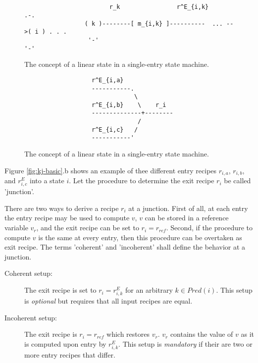 \documentclass[12pt,a4paper]{scrartcl}
\begin{document}
\begin{figure}[htbp] \leavevmode \label{fig:composition}
\begin{verbatim}
                                                     
                                                    
                        r_k                r^E_{i,k}      .-.
                 ( k )--------[ m_{i,k} ]----------  ... -->( i ) . . .
                  '-'                                     '-'

\end{verbatim}
\caption{The concept of a linear state in a single-entry state machine.}
\end{figure}

\begin{figure}[htbp] \leavevmode \label{fig:junction}
\begin{verbatim}
                   r^E_{i,a}
                   -----------.
                               \
                   r^E_{i,b}    \    r_i
                   --------------+--------
                                /
                   r^E_{i,c}   /
                   -----------'

\end{verbatim}
\caption{The concept of a linear state in a single-entry state machine.}
\end{figure}

Figure \ref{fig:kj-basic}.b shows an example of thee different entry recipes
$r_{i,a}$, $r_{i,b}$, and $r^E_{i,c}$ into a state $i$.  Let the procedure to
determine the exit recipe $r_i$ be called 'junction'. 

There are two ways to derive a recipe $r_i$ at a junction.  First of all, at
each entry the entry recipe may be used to compute $v$, $v$ can be stored in a
reference variable $v_r$, and the exit recipe can be set to $r_i=r_{ref}$.
Second, if the procedure to compute $v$ is the same at every entry, then this
procedure can be overtaken as exit recipe. The terms 'coherent' and 'incoherent'
shall define the behavior at a junction. 

\begin{description}

    \item[Coherent setup:] The exit recipe is set to $r_i=r^E_{i,k}$ for
        an arbitrary $k\in Pred(i)$. This setup is \textit{optional} but
        requires that all input recipes are equal.

    \item[Incoherent setup:] The exit recipe is $r_i=r_{ref}$ which restores $v_r$.
        $v_r$ contains the value of $v$ as it is computed upon entry by
        $r^E_{i,k}$.  This setup is \textit{mandatory} if their are two or more
        entry recipes that differ.

\end{description}
\end{document}
